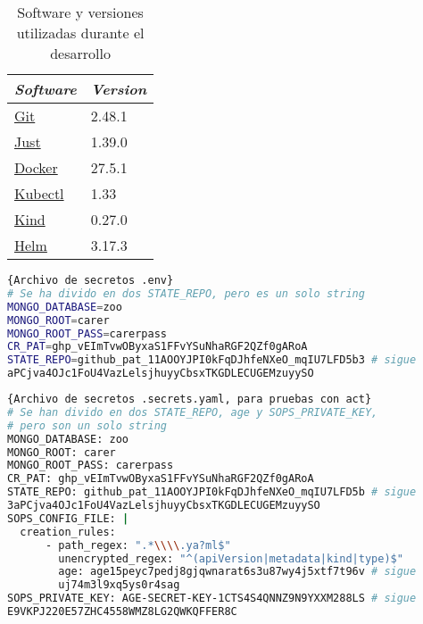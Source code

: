 \begin{table}
  \centering
  \begin{tabular}{|l|l|}
    \hline
    \textit{Software} & \textit{Version} \\ \hline
    \href{https://git-scm.com/book/en/v2/Getting-Started-Installing-Git}{Git} & 2.48.1 \\ \hline
    \href{https://github.com/casey/just?tab=readme-ov-file#installation}{Just} & 1.39.0 \\ \hline
    \href{https://docs.docker.com/desktop/}{Docker} & 27.5.1 \\ \hline
    \href{https://kubernetes.io/docs/tasks/tools/#kubectl}{Kubectl} & 1.33 \\ \hline
    \href{https://kubernetes.io/docs/tasks/tools/#kind}{Kind} & 0.27.0 \\ \hline
    \href{https://helm.sh/docs/intro/install/}{Helm} & 3.17.3 \\ \hline
  \end{tabular}
  \caption{Software y versiones utilizadas durante el desarrollo}
  \label{table:software}
\end{table}




\begin{lstlisting}[language=bash,label=lst:env-file]{Archivo de secretos .env}
# Se ha divido en dos STATE_REPO, pero es un solo string
MONGO_DATABASE=zoo
MONGO_ROOT=carer
MONGO_ROOT_PASS=carerpass
CR_PAT=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
STATE_REPO=github_pat_11AOOYJPI0kFqDJhfeNXeO_mqIU7LFD5b3 # sigue
aPCjva4OJc1FoU4VazLelsjhuyyCbsxTKGDLECUGEMzuyySO
\end{lstlisting}

\begin{lstlisting}[language=bash,label=lst:env-file]{Archivo de secretos .secrets.yaml, para pruebas con act}
# Se han divido en dos STATE_REPO, age y SOPS_PRIVATE_KEY,
# pero son un solo string
MONGO_DATABASE: zoo
MONGO_ROOT: carer
MONGO_ROOT_PASS: carerpass
CR_PAT: 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
STATE_REPO: github_pat_11AOOYJPI0kFqDJhfeNXeO_mqIU7LFD5b # sigue
3aPCjva4OJc1FoU4VazLelsjhuyyCbsxTKGDLECUGEMzuyySO
SOPS_CONFIG_FILE: |
  creation_rules:
      - path_regex: ".*\\\\.ya?ml$"
        unencrypted_regex: "^(apiVersion|metadata|kind|type)$"
        age: age15peyc7pedj8gjqwnarat6s3u87wy4j5xtf7t96v # sigue
        uj74m3l9xq5ys0r4sag
SOPS_PRIVATE_KEY: AGE-SECRET-KEY-1CTS4S4QNNZ9N9YXXM288LS # sigue
E9VKPJ220E57ZHC4558WMZ8LG2QWKQFFER8C
\end{lstlisting}

